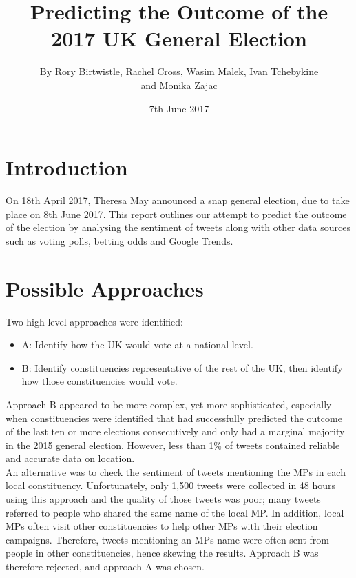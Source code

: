 \documentclass{article}
\begin{document}
\title{Predicting the Outcome of the 2017 UK General Election}
\author{By Rory Birtwistle, Rachel Cross, Wasim Malek, Ivan Tchebykine \\ and Monika Zajac}
\date{7th June 2017}
\maketitle
\newpage

\tableofcontents
\newpage

\section{Introduction}
On 18th April 2017, Theresa May announced a snap general election, due to take place on 8th June 2017. This report outlines our attempt to predict the outcome of the election by analysing the sentiment of tweets along with other data sources such as voting polls, betting odds and Google Trends.

\section{Possible Approaches}
Two high-level approaches were identified:

\begin{itemize}
\item A: Identify how the UK would vote at a national level.
\item B: Identify constituencies representative of the rest of the UK, then identify how those constituencies would vote.
\end{itemize}

Approach B appeared to be more complex, yet more sophisticated, especially when constituencies were identified that had successfully predicted the outcome of the last ten or more elections consecutively and only had a marginal majority in the 2015 general election. However, less than 1\% of tweets contained reliable and accurate data on location. \\

An alternative was to check the sentiment of tweets mentioning the MPs in each local constituency. Unfortunately, only 1,500 tweets were collected in 48 hours using this approach and the quality of those tweets was poor; many tweets referred to people who shared the same name of the local MP. In addition, local MPs often visit other constituencies to help other MPs with their election campaigns. Therefore, tweets mentioning an MPs name were often sent from people in other constituencies, hence skewing the results. Approach B was therefore rejected, and approach A was chosen.
\end{document}
